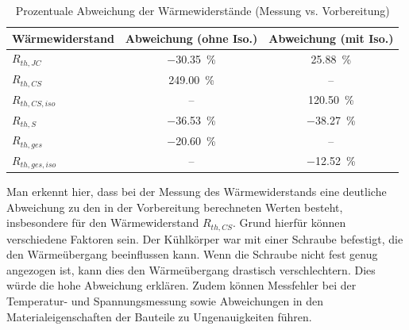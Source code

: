 \begin{table}[H]
    \centering
    \renewcommand{\arraystretch}{1.3}
    \begin{tabular}{l|c|c}
        \toprule
        \textbf{Wärmewiderstand} & \textbf{Abweichung (ohne Iso.)} & \textbf{Abweichung (mit Iso.)} \\
        \midrule
        $R_{th,JC}$              & \SI{-30.35}{\percent}           & \SI{+25.88}{\percent}          \\
        \midrule
        $R_{th,CS}$              & \SI{+249.00}{\percent}          & --                             \\
        $R_{th,CS, iso}$         & --                              & \SI{+120.50}{\percent}         \\
        \midrule
        $R_{th,S}$               & \SI{-36.53}{\percent}           & \SI{-38.27}{\percent}          \\
        \midrule
        $R_{th,ges}$             & \SI{-20.60}{\percent}           & --                             \\
        $R_{th,ges, iso}$        & --                              & \SI{-12.52}{\percent}          \\
        \bottomrule
    \end{tabular}
    \caption{Prozentuale Abweichung der Wärmewiderstände (Messung vs. Vorbereitung)}
    \label{tab:abweichung_rth}
\end{table}

Man erkennt hier, dass bei der Messung des Wärmewiderstands eine deutliche Abweichung zu den in der Vorbereitung berechneten Werten besteht, insbesondere für den Wärmewiderstand $R_{th,CS}$. Grund hierfür können verschiedene Faktoren sein. Der Kühlkörper war mit einer Schraube befestigt, die den Wärmeübergang beeinflussen kann. Wenn die Schraube nicht fest genug angezogen ist, kann dies den Wärmeübergang drastisch verschlechtern. Dies würde die hohe Abweichung erklären. Zudem können Messfehler bei der Temperatur- und Spannungsmessung sowie Abweichungen in den Materialeigenschaften der Bauteile zu Ungenauigkeiten führen.


